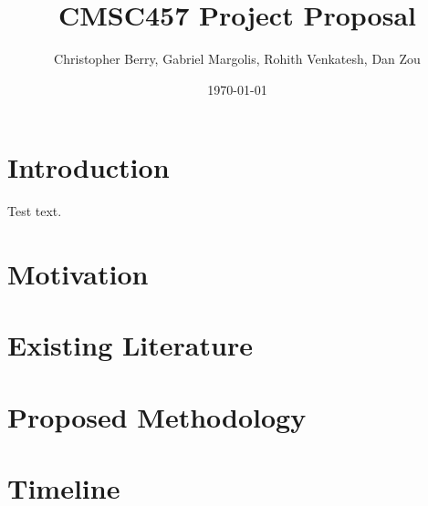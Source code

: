 \documentclass[letter,draft]{article}
\title{CMSC457 Project Proposal}
\author{Christopher Berry, Gabriel Margolis, Rohith Venkatesh, Dan Zou}
\date{\today}
\begin{document}
\maketitle

\section{Introduction}
Test text\cite{rebentrost_quantum_2014}.
\section{Motivation}
\section{Existing Literature}
\section{Proposed Methodology}
\section{Timeline}
\printbibliography
\end{document}
